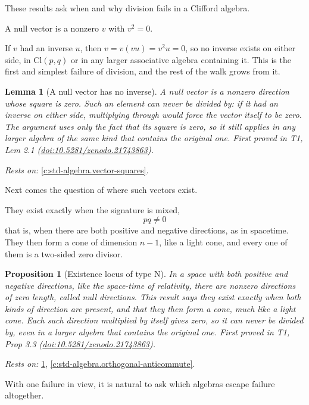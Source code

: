 \documentclass[11pt]{article}
\newtheorem{proposition}[theorem]{Proposition}
\newtheorem{lemma}[theorem]{Lemma}
\theoremstyle{definition}
\theoremstyle{plain}
\providecommand{\Cl}{}\renewcommand{\Cl}{\mathrm{Cl}}
\begin{document}
These results ask when and why division fails in a Clifford algebra.

A null vector is a nonzero $v$ with $v^{2} = 0$.

If $v$ had an inverse $u$, then $v = v(vu) = v^{2} u = 0$, so no inverse exists on either side, in $\Cl(p,q)$ or in any larger associative algebra containing it. This is the first and simplest failure of division, and the rest of the walk grows from it.

\begin{lemma}[A null vector has no inverse]\label{c:transport.noinverse}
A null vector is a nonzero direction whose square is zero. Such an element can never be divided by: if it had an inverse on either side, multiplying through would force the vector itself to be zero. The argument uses only the fact that its square is zero, so it still applies in any larger algebra of the same kind that contains the original one.
\emph{First proved in} T1, Lem 2.1 (\href{https://doi.org/10.5281/zenodo.21743863}{doi:10.5281/zenodo.21743863}).
\end{lemma}
\noindent\emph{Rests on:} \ref{c:std-algebra.vector-squares}.

Next comes the question of where such vectors exist.

They exist exactly when the signature is mixed, \[ pq \neq 0 \] that is, when there are both positive and negative directions, as in spacetime. They then form a cone of dimension $n - 1$, like a light cone, and every one of them is a two-sided zero divisor.

\begin{proposition}[Existence locus of type N]\label{c:transport.existence-locus-type-n}
In a space with both positive and negative directions, like the space-time of relativity, there are nonzero directions of zero length, called null directions. This result says they exist exactly when both kinds of direction are present, and that they then form a cone, much like a light cone. Each such direction multiplied by itself gives zero, so it can never be divided by, even in a larger algebra that contains the original one.
\emph{First proved in} T1, Prop 3.3 (\href{https://doi.org/10.5281/zenodo.21743863}{doi:10.5281/zenodo.21743863}).
\end{proposition}
\noindent\emph{Rests on:} \ref{c:transport.noinverse}, \ref{c:std-algebra.orthogonal-anticommute}.

With one failure in view, it is natural to ask which algebras escape failure altogether.
\end{document}
